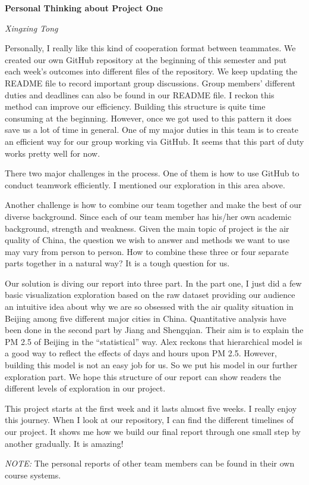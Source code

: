 \documentclass[11pt]{article} %
\begin{document}
\newpage



\textbf{Personal Thinking about Project One}

\textit{Xingxing Tong}

Personally, I really like this kind of cooperation format between teammates. We created our own GitHub repository at the beginning of this semester and put each week’s outcomes into different files of the repository. We keep updating the README file to record important group discussions. Group members’ different duties and deadlines can also be found in our README file. I reckon this method can improve our efficiency. Building this structure is quite time consuming at the beginning. However, once we got used to this pattern it does save us a lot of time in general. One of my major duties in this team is to create an efficient way for our group working via GitHub. It seems that this part of duty works pretty well for now.

There two major challenges in the process. One of them is how to use GitHub to conduct teamwork efficiently. I mentioned our exploration in this area above.

Another challenge is how to combine our team together and make the best of our diverse background. Since each of our team member has his/her own academic background, strength and weakness. Given the main topic of project is the air quality of China, the question we wish to answer and methods we want to use may vary from person to person. How to combine these three or four separate parts together in a natural way? It is a tough question for us.

Our solution is diving our report into three part. In the part one, I just did a few basic visualization exploration based on the raw dataset providing our audience an intuitive idea about why we are so obsessed with the air quality situation in Beijing among five different major cities in China. Quantitative analysis have been done in the second part by Jiang and Shengqian. Their aim is to explain the PM 2.5 of Beijing in the “statistical” way. Alex reckons that hierarchical model is a good way to reflect the effects of days and hours upon PM 2.5. However, building this model is not an easy job for us. So we put his model in our further exploration part. We hope this structure of our report can show readers the different levels of exploration in our project.

This project starts at the first week and it lasts almost five weeks. I really enjoy this journey. When I look at our repository, I can find the different timelines of our project. It shows me how we build our final report through one small step by another gradually. It is amazing!



\emph{NOTE:} The personal reports of other team members can be found in their own course systems.
\end{document}
